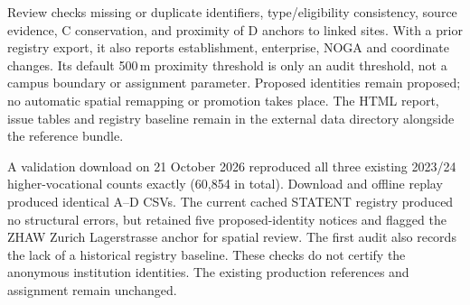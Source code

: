 \documentclass[11pt,a4paper]{article}
\begin{document}
Review checks missing or duplicate identifiers, type/eligibility consistency,
source evidence, C conservation, and proximity of D anchors to linked sites.
With a prior registry export, it also reports establishment, enterprise, NOGA
and coordinate changes. Its default 500\,m proximity threshold is only an audit
threshold, not a campus boundary or assignment parameter. Proposed identities
remain proposed; no automatic spatial remapping or promotion takes place.
The HTML report, issue tables and registry baseline remain in the external
data directory alongside the reference bundle.

A validation download on 21 October 2026 reproduced all three existing 2023/24
higher-vocational counts exactly (60,854 in total). Download and offline replay
produced identical A--D CSVs. The current cached STATENT registry produced no
structural errors, but retained five proposed-identity notices and flagged the
ZHAW Zurich Lagerstrasse anchor for spatial review. The first audit also records
the lack of a historical registry baseline. These checks do not certify the
anonymous institution identities. The existing production references and
assignment remain unchanged.
\end{document}
